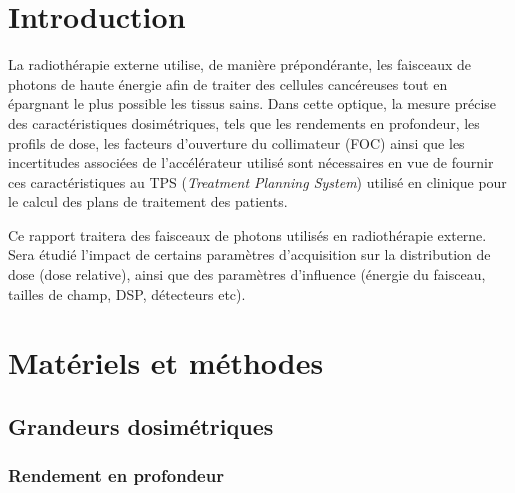 \documentclass{book}
\begin{document}




\onehalfspacing

\pagestyle{fancy}
	\renewcommand\headrulewidth{0.5pt}
	\renewcommand\footrulewidth{0.5pt}
	\fancyfoot[R]{\thepage}

\tableofcontents
\clearpage
\chapter{Introduction}

La radiothérapie externe utilise, de manière prépondérante, les faisceaux de photons de haute énergie afin de traiter des cellules cancéreuses tout en épargnant le plus possible les tissus sains. Dans cette optique, la mesure précise des caractéristiques dosimétriques, tels que les rendements en profondeur, les profils de dose, les facteurs d'ouverture du collimateur (FOC) ainsi que les incertitudes associées de l'accélérateur utilisé sont nécessaires en vue de fournir ces caractéristiques au TPS (\textit{Treatment Planning System}) utilisé en clinique pour le calcul des plans de traitement des patients.

Ce rapport traitera des faisceaux de photons utilisés en radiothérapie externe. Sera étudié l'impact de certains paramètres d'acquisition sur la distribution de dose (dose relative), ainsi que des paramètres d'influence (énergie du faisceau, tailles de champ, DSP, détecteurs etc).

\chapter{Matériels et méthodes}
\section{Grandeurs dosimétriques}
\subsection{Rendement en profondeur}
\end{document}
